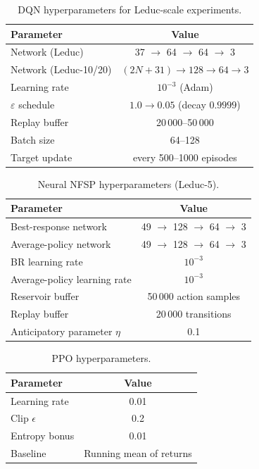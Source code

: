 \documentclass{article}
\begin{document}
\begin{table}[ht]
\centering
\caption{DQN hyperparameters for Leduc-scale experiments.}
\begin{tabular}{lc}
\toprule
Parameter & Value \\
\midrule
Network (Leduc) & 37 $\to$ 64 $\to$ 64 $\to$ 3 \\
Network (Leduc-10/20) & $(2N{+}31) \to 128 \to 64 \to 3$ \\
Learning rate & $10^{-3}$ (Adam) \\
$\varepsilon$ schedule & $1.0 \to 0.05$ (decay $0.9999$) \\
Replay buffer & 20\,000--50\,000 \\
Batch size & 64--128 \\
Target update & every 500--1000 episodes \\
\bottomrule
\end{tabular}
\end{table}

\begin{table}[ht]
\centering
\caption{Neural NFSP hyperparameters (Leduc-5).}
\begin{tabular}{lc}
\toprule
Parameter & Value \\
\midrule
Best-response network & 49 $\to$ 128 $\to$ 64 $\to$ 3 \\
Average-policy network & 49 $\to$ 128 $\to$ 64 $\to$ 3 \\
BR learning rate & $10^{-3}$ \\
Average-policy learning rate & $10^{-3}$ \\
Reservoir buffer & 50\,000 action samples \\
Replay buffer & 20\,000 transitions \\
Anticipatory parameter $\eta$ & 0.1 \\
\bottomrule
\end{tabular}
\end{table}

\begin{table}[ht]
\centering
\caption{PPO hyperparameters.}
\begin{tabular}{lc}
\toprule
Parameter & Value \\
\midrule
Learning rate & 0.01 \\
Clip $\epsilon$ & 0.2 \\
Entropy bonus & 0.01 \\
Baseline & Running mean of returns \\
\bottomrule
\end{tabular}
\end{table}
\end{document}
